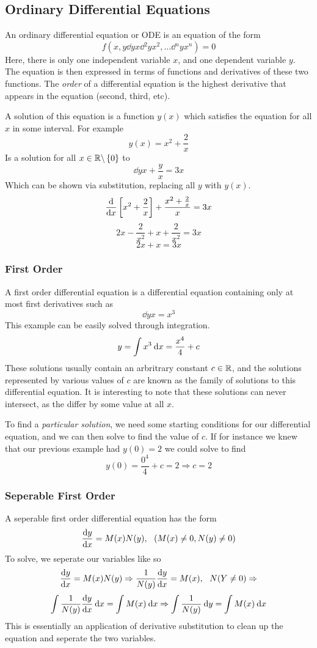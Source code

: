 \documentclass[12pt]{report}
\begin{document}
\begin{flushleft}
\subsection*{Ordinary Differential Equations}

An ordinary differential equation or ODE is an equation of the form
\[f\left(x, y \dd{y}{x} \dd{^2y}{x^2}, \ldots \dd{^ny}{x^n}\right) = 0\]
Here, there is only one independent variable \(x\), and one dependent variable
\(y\). The equation is then expressed in terms of functions and derivatives of
these two functions. The \textit{order} of a differential equation is the
highest derivative that appears in the equation (second, third, etc). \par
A solution of this equation is a function \(y(x)\) which satisfies the equation
for all \(x\) in some interval. For example
\[y(x) = x^2 + \frac{2}{x}\]
Is a solution for all \(x\in\mathbb{R}\backslash\set{0}\) to
\[\dd{y}{x} + \frac{y}{x} = 3x\]
Which can be shown via substitution, replacing all \(y\) with \(y(x)\).
\[\frac{\mathrm{d}}{\mathrm{d}x}\left[x^2 + \frac{2}{x}\right] + \frac{x^2 + \frac{2}{x}}{x} = 3x\]
\[2x - \frac{2}{x^2} + x + \frac{2}{x^2} = 3x\]
\[2x + x = 3x\]

\subsubsection*{First Order}

A first order differential equation is a differential equation containing only
at most first derivatives such as
\[\dd{y}{x} = x^3\]
This example can be easily solved through integration.
\[y = \int x^3 \:\mathrm{d}x = \frac{x^4}{4} + c\]
These solutions usually contain an arbritrary constant \(c\in\mathbb{R}\), and the
solutions represented by various values of \(c\) are known as the family of
solutions to this differential equation. It is interesting to note that these
solutions can never intersect, as the differ by some value at all \(x\). \par
To find a \textit{particular solution}, we need some starting conditions for
our differential equation, and we can then solve to find the value of \(c\).
If for instance we knew that our previous example had \(y(0) = 2\) we could
solve to find
\[y(0) = \frac{0^4}{4} + c = 2 \Rightarrow c = 2\]

\subsubsection*{Seperable First Order}

A seperable first order differential equation has the form
\[\frac{\mathrm{d}y}{\mathrm{d}x} = M(x)N(y) , \:\:\: (M(x)\neq0, N(y)\neq0)\]
To solve, we seperate our variables like so
\[\frac{\mathrm{d}y}{\mathrm{d}x} = M(x)N(y) \Rightarrow \frac{1}{N(y)}\frac{\mathrm{d}y}{\mathrm{d}x} 
= M(x), \:\:\: N(Y\neq0) \Rightarrow\]
\[\int \frac{1}{N(y)}\frac{\mathrm{d}y}{\mathrm{d}x}\:\mathrm{d}x = \int M(x)\:\mathrm{d}x \Rightarrow 
\int \frac{1}{N(y)}\:\mathrm{d}y = \int M(x)\:\mathrm{d}x\]
This is essentially an application of derivative substitution to clean up the
equation and seperate the two variables.


\end{flushleft}
\end{document}
